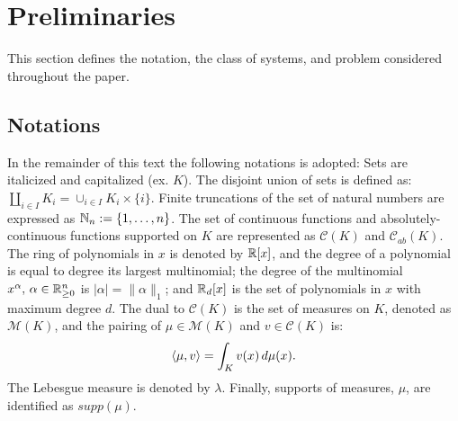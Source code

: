   \section{Preliminaries}
\label{sec:preliminaries}
  This section defines the notation, the class of systems, and problem considered throughout the paper.

  \subsection{Notations}
  In the remainder of this text the following notations is adopted: 
Sets are italicized and capitalized (ex. $K$). 
The disjoint union of sets is defined as: $\coprod_{i\in I}K_i=\cup_{i\in I}K_i\times \{i\}$. 
Finite truncations of the set of natural numbers are expressed as \mbox{$\mathbb{N}_n:=\{1,\ldots,n\}$}. 
The set of continuous functions and absolutely-continuous functions supported on $K$ are represented as $\mathcal C(K)$ and $\mathcal C_{ab}(K)$. 
The ring of polynomials in $x$ is denoted by $\mathbb{R}[x]$, and the degree of a polynomial is equal to degree its largest multinomial; the degree of the multinomial $x^\alpha,\,\alpha\in \mathbb{R}_{\ge 0}^n$ is $|\alpha|=\|\alpha\|_1$; and $\mathbb{R}_d[x]$ is the set of polynomials in $x$ with maximum degree $d$. 
The dual to $\mathcal C(K)$ is the set of measures on $K$, denoted as $\mathcal M(K)$, and the pairing of $\mu\in \mathcal M(K)$ and $v\in \mathcal C(K)$ is:
  \begin{align}
  \left\langle \mu,v\right\rangle=\int_{K}v(x)\,d\mu(x).
  \end{align}
The Lebesgue measure is denoted by $\lambda$. Finally, supports of measures, $\mu$, are identified as $supp(\mu)$.

